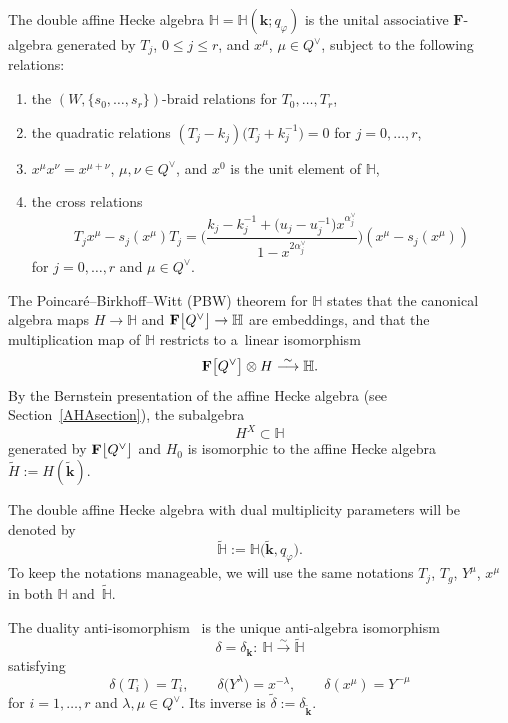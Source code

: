 \begin{Definition}
The double affine Hecke algebra $\mathbb{H}=\mathbb{H}(\mathbf{k};q_\varphi)$ is the unital associative $\mathbf{F}$-algebra generated by
$T_j$, $0\leq j\leq r$, and $x^\mu$, $\mu\in Q^\vee$, subject to the following relations:
\begin{enumerate}\itemsep=0pt
\item[(a)] the $(W,\{s_0,\dots,s_r\})$-braid relations for $T_0,\dots,T_r$,
\item[(b)] the quadratic relations $(T_j-k_j)\bigl(T_j+k_j^{-1}\bigr)=0$ for $j=0,\dots,r$,
\item[(c)] $x^\mu x^\nu=x^{\mu+\nu}$, $\mu,\nu\in Q^\vee$, and $x^0$ is the unit element of $\mathbb{H}$,
\item[(d)] the cross relations
\begin{equation}\label{crossX}
T_jx^\mu-s_j(x^\mu)T_j=\Biggl(\frac{k_j-k_j^{-1}+\bigl(u_j-u_j^{-1}\bigr)x^{\alpha_j^\vee}}{1-x^{2\alpha_j^\vee}}\Biggr)(x^\mu-s_j(x^\mu))
\end{equation}
for $j=0,\dots,r$ and $\mu\in Q^\vee$.
\end{enumerate}
\end{Definition}
The Poincar{\'e}--Birkhoff--Witt (PBW) theorem for $\mathbb{H}$ states that the canonical algebra maps $H\rightarrow \mathbb{H}$ and $\mathbf{F}\smash{\bigl[Q^\vee\bigr]}\rightarrow
\mathbb{H}$
are embeddings, and that
the multiplication map of $\mathbb{H}$ restricts to a~linear isomorphism
\[
\mathbf{F}\smash{\bigl[Q^\vee\bigr]}\otimes H\overset{\sim}{\longrightarrow} \mathbb{H}.
\]
By the Bernstein presentation of the affine Hecke algebra (see Section~\ref{AHAsection}), the subalgebra
\[
H^X\subset\mathbb{H}
\]
generated by $\mathbf{F}\smash{\bigl[Q^\vee\bigr]}$ and $H_0$ is isomorphic to the affine Hecke algebra $\widetilde{H}:=H(\widetilde{\mathbf{k}})$.

The double affine Hecke algebra with dual multiplicity parameters will be denoted by
\[
\widetilde{\mathbb{H}}:=\mathbb{H}\bigl(\widetilde{\mathbf{k}},q_\varphi\bigr).
\]
To keep the notations manageable, we will use the same notations $T_j$, $T_g$, $Y^\mu$, $x^\mu$ in both $\mathbb{H}$ and~$\widetilde{\mathbb{H}}$.

The duality anti-isomorphism~\cite{ChBook,Sa} is the unique anti-algebra isomorphism
\[
\delta=\delta_{\mathbf{k}}\colon\ \mathbb{H}\overset{\sim}{\longrightarrow}\widetilde{\mathbb{H}}
\]
satisfying
\[
\delta(T_i)=T_i,\qquad \delta\bigl(Y^\lambda\bigr)=x^{-\lambda},\qquad \delta(x^\mu)=Y^{-\mu}
\]
for $i=1,\dots,r$ and $\lambda,\mu\in Q^\vee$. Its inverse is $\widetilde{\delta}:=\delta_{\widetilde{\mathbf{k}}}$.

